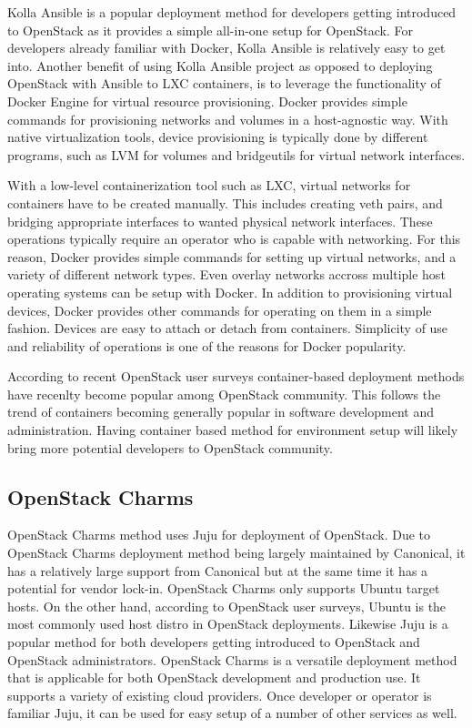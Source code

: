 Kolla Ansible is a popular deployment method for developers getting introduced
to OpenStack as it provides a simple all-in-one setup for OpenStack. For
developers already familiar with Docker, Kolla Ansible is relatively easy to
get into. Another benefit of using Kolla Ansible project as opposed to
deploying OpenStack with Ansible to LXC containers, is to leverage the
functionality of Docker Engine for virtual resource provisioning. Docker
provides simple commands for provisioning networks and volumes in a
host-agnostic way. With native virtualization tools, device provisioning is
typically done by different programs, such as LVM for volumes and bridgeutils
for virtual network interfaces.

With a low-level containerization tool such as LXC, virtual networks for
containers have to be created manually. This includes creating veth pairs, and
bridging appropriate interfaces to wanted physical network interfaces. These
operations typically require an operator who is capable with networking. For
this reason, Docker provides simple commands for setting up virtual networks,
and a variety of different network types. Even overlay networks accross
multiple host operating systems can be setup with Docker. In addition to
provisioning virtual devices, Docker provides other commands for operating on
them in a simple fashion. Devices are easy to attach or detach from containers.
Simplicity of use and reliability of operations is one of the reasons for
Docker popularity.

According to recent OpenStack user surveys container-based deployment methods
have recenlty become popular among OpenStack community. This follows the trend
of containers becoming generally popular in software development and
administration. Having container based method for environment setup will likely
bring more potential developers to OpenStack community.

\subsection{OpenStack Charms}

OpenStack Charms \cite{charm-deployment-guide} method uses Juju for deployment
of OpenStack. Due to OpenStack Charms deployment method being largely
maintained by Canonical, it has a relatively large support from Canonical but
at the same time it has a potential for vendor lock-in. OpenStack Charms only
supports Ubuntu target hosts. On the other hand, according to OpenStack user
surveys, Ubuntu is the most commonly used host distro in OpenStack deployments.
Likewise Juju is a popular method for both developers getting introduced to
OpenStack and OpenStack administrators. OpenStack Charms is a versatile
deployment method that is applicable for both OpenStack development and
production use. It supports a variety of existing cloud providers. Once
developer or operator is familiar Juju, it can be used for easy setup of a
number of other services as well.


